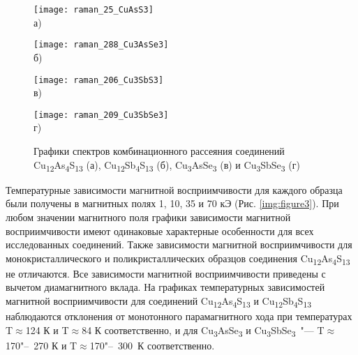 \begin{figure}[ht]
  \begin{minipage}[ht]{0.5\linewidth}\centering
    \texttt{[image: raman\_25\_CuAsS3]} \\ а)
  \end{minipage}
  \hfill
  \begin{minipage}[ht]{0.5\linewidth}\centering
    \texttt{[image: raman\_288\_Cu3AsSe3]} \\ б)
  \end{minipage}
\vfill
  \begin{minipage}[ht]{0.5\linewidth}\centering
    \texttt{[image: raman\_206\_Cu3SbS3]} \\ в)
  \end{minipage}
  \hfill
  \begin{minipage}[ht]{0.5\linewidth}\centering
    \texttt{[image: raman\_209\_Cu3SbSe3]} \\ г)
  \end{minipage}

      \caption[Графики спектров комбинационного рассеяния соединений Cu\textsubscript{12}As\textsubscript{4}S\textsubscript{13} (а), Cu\textsubscript{12}Sb\textsubscript{4}S\textsubscript{13} (б), Cu\textsubscript{3}AsSe\textsubscript{3} (в) и Cu\textsubscript{3}SbSe\textsubscript{3} (г)]{Графики спектров комбинационного рассеяния соединений Cu\textsubscript{12}As\textsubscript{4}S\textsubscript{13} (а), Cu\textsubscript{12}Sb\textsubscript{4}S\textsubscript{13} (б), Cu\textsubscript{3}AsSe\textsubscript{3} (в) и Cu\textsubscript{3}SbSe\textsubscript{3} (г)}
    \label{img:figure_raman}
\end{figure}



Температурные зависимости магнитной восприимчивости для каждого
 образца были получены в магнитных полях 1, 10, 35 и 70 кЭ (Рис. \ref{img:figure3}).
При любом значении магнитного поля графики зависимости магнитной восприимчивости
 имеют одинаковые характерные особенности для всех исследованных соединений.
 Также зависимости магнитной восприимчивости для монокристаллического и
 поликристаллических образцов соединения Cu\textsubscript{12}As\textsubscript{4}S\textsubscript{13} не отличаются.
Все зависимости магнитной восприимчивости приведены с вычетом диамагнитного вклада.
На графиках температурных зависимостей магнитной восприимчивости для соединений Cu\textsubscript{12}As\textsubscript{4}S\textsubscript{13} и Cu\textsubscript{12}Sb\textsubscript{4}S\textsubscript{13}  наблюдаются отклонения от монотонного парамагнитного хода при температурах T$\approx$124 К и T$\approx$84 К соответственно, и для Cu\textsubscript{3}AsSe\textsubscript{3} и Cu\textsubscript{3}SbSe\textsubscript{3}~"---  T$\approx$170"--~270 К и T$\approx$170"--~300~К соответственно.

